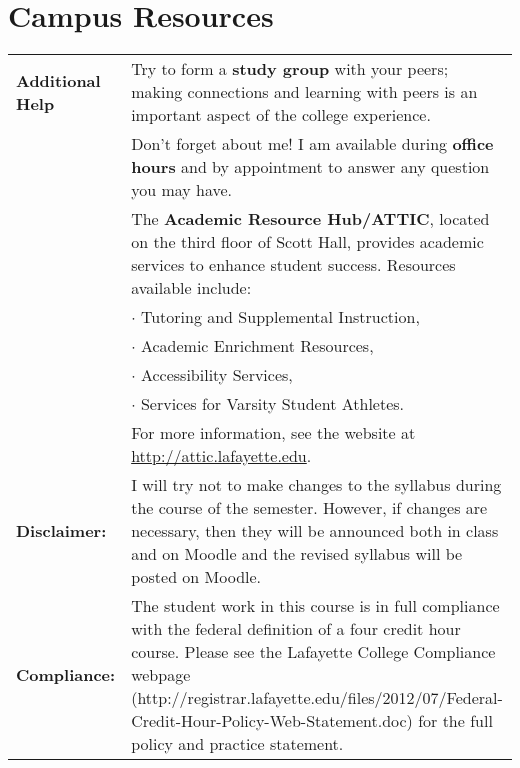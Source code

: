 \documentclass[10pt]{amsart}
\begin{document}
\section*{Campus Resources}
\noindent
\begin{tabular}{p{1.4in}p{5in}}
 {\bf Additional Help} & Try to form a {\bf study group} with your peers; making connections and learning with peers is an important aspect of the college experience.\\
  & Don't forget about me!  I am available during {\bf office hours} and by appointment to answer any question you may have.\\
  & The {\bf Academic Resource Hub/ATTIC}, located on the third floor of Scott Hall, provides academic services to enhance student success.  Resources available include:\\
  & $\cdot$ Tutoring and Supplemental Instruction,\\
  & $\cdot$ Academic Enrichment Resources,\\
  & $\cdot$ Accessibility Services,\\
  & $\cdot$ Services for Varsity Student Athletes.\\
  & For more information, see the website at \url{http://attic.lafayette.edu}.\\
  
  {\bf Disclaimer:} & I will try not to make changes to the syllabus during the course of the semester.  However, if changes are necessary, then they will be announced both in class and on Moodle and the revised syllabus will be posted on Moodle.\\
{\bf Compliance:}  & The student work in this course is in full compliance with the federal definition of a four credit hour course.  Please see the Lafayette College Compliance webpage (http://registrar.lafayette.edu/files/2012/07/Federal-Credit-Hour-Policy-Web-Statement.doc) for the full policy and practice statement.\\
\end{tabular}


\end{document}
